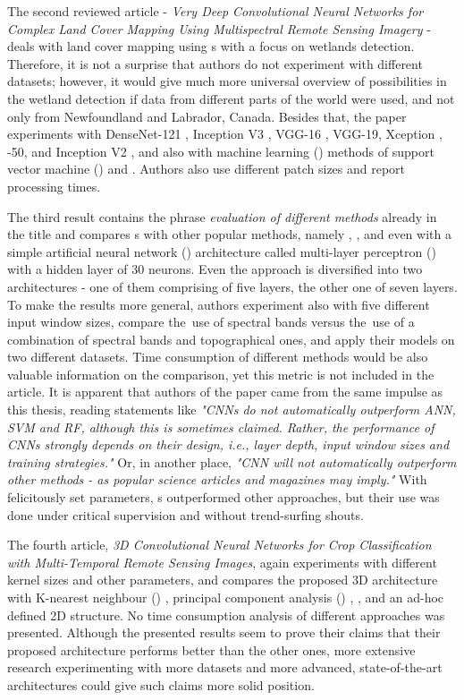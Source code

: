 The second reviewed article - \textit{Very Deep Convolutional Neural Networks for Complex Land Cover Mapping Using Multispectral Remote Sensing Imagery} - deals with land cover mapping using s with a focus on wetlands detection. Therefore, it is not a surprise that authors do not experiment with different datasets; however, it would give much more universal overview of  possibilities in the wetland detection if data from different parts of the world were used, and not only from Newfoundland and Labrador, Canada. Besides that, the paper experiments with DenseNet-121 \cite{densenet}, Inception V3 \cite{inception}, VGG-16 \cite{vgg}, VGG-19, Xception \cite{xception}, -50, and Inception  V2 \cite{inception-resnet}, and also with machine learning () methods of support vector machine () \cite{svm} and . Authors also use different patch sizes and report processing times.

The third result contains the phrase \textit{evaluation of different methods} already in the title and compares s with other popular  methods, namely , , and even with a simple artificial neural network () architecture called multi-layer perceptron () \cite{mlp} with a hidden layer of 30 neurons. Even the  approach is diversified into two architectures - one of them comprising of five layers, the other one of seven layers. To make the results more general, authors experiment also with five different input window sizes, compare the~use of spectral bands versus the~use of a combination of spectral bands and topographical ones, and apply their models on two different datasets. Time consumption of different methods would be also valuable information on the comparison, yet this metric is not included in the article. It is apparent that authors of the paper came from the same impulse as this thesis, reading statements like \textit{"CNNs do not automatically outperform ANN, SVM and RF, although this is sometimes claimed. Rather, the performance of CNNs strongly depends on their design, i.e., layer depth, input window sizes and training strategies."} Or, in another place, \textit{"CNN will not automatically outperform other methods - as popular science articles and magazines may imply."} With felicitously set parameters, s outperformed other approaches, but their use was done under critical supervision and without trend-surfing shouts.

The fourth article, \textit{3D Convolutional Neural Networks for Crop Classification with Multi-Temporal Remote Sensing Images}, again experiments with different kernel sizes and other parameters, and compares the proposed 3D  architecture with K-nearest neighbour () \cite{knn}, principal component analysis () \cite{pca}, , and an ad-hoc defined 2D  structure. No time consumption analysis of different approaches was presented. Although the presented results seem to prove their claims that their proposed architecture performs better than the other ones, more extensive research experimenting with more datasets and more advanced, state-of-the-art architectures could give such claims more solid position.

